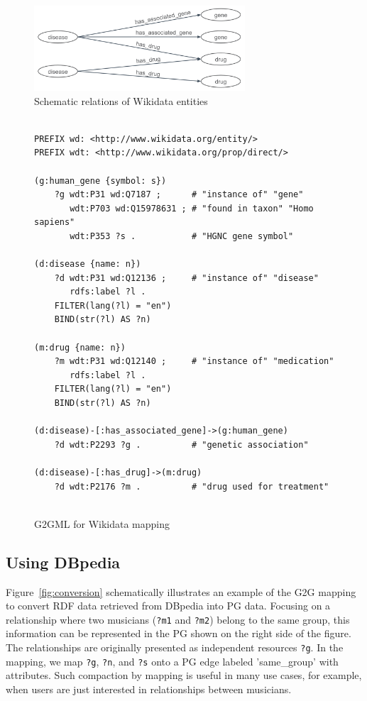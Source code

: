 \documentclass[runningheads]{llncs}
\begin{document}
\begin{figure}
\center
\includegraphics[width=0.7\textwidth]{wikidata_schema.png}
\caption{Schematic relations of Wikidata entities}
\label{fig:wikidata_schema.png}
\end{figure}
 
\begin{figure}[!t]
\vspace{2mm}
\begin{scriptsize}
\begin{verbatim}
 
PREFIX wd: <http://www.wikidata.org/entity/>
PREFIX wdt: <http://www.wikidata.org/prop/direct/>
 
(g:human_gene {symbol: s})
    ?g wdt:P31 wd:Q7187 ;      # "instance of" "gene"
       wdt:P703 wd:Q15978631 ; # "found in taxon" "Homo sapiens"
       wdt:P353 ?s .           # "HGNC gene symbol"
 
(d:disease {name: n})
    ?d wdt:P31 wd:Q12136 ;     # "instance of" "disease"
       rdfs:label ?l .
    FILTER(lang(?l) = "en")
    BIND(str(?l) AS ?n)
 
(m:drug {name: n})
    ?m wdt:P31 wd:Q12140 ;     # "instance of" "medication"
       rdfs:label ?l .
    FILTER(lang(?l) = "en")
    BIND(str(?l) AS ?n)
 
(d:disease)-[:has_associated_gene]->(g:human_gene)
    ?d wdt:P2293 ?g .          # "genetic association"
 
(d:disease)-[:has_drug]->(m:drug)
    ?d wdt:P2176 ?m .          # "drug used for treatment"
 
\end{verbatim}
\end{scriptsize}
\caption{G2GML for Wikidata mapping}
\label{fig:g2gml_wikidata}
\end{figure}
 
\subsection{Using DBpedia}
 
Figure~\ref{fig:conversion} schematically illustrates an example of the G2G mapping to convert RDF data retrieved from DBpedia into PG data. 
Focusing on a relationship where two musicians (\texttt{?m1} and \texttt{?m2}) belong to the same group, this information can be represented in the PG shown on the right side of the figure. The relationships are originally presented as independent resources \texttt{?g}. In the mapping, we map \texttt{?g}, \texttt{?n}, and \texttt{?s} onto a PG edge labeled 'same_group' with attributes. Such compaction by mapping is useful in many use cases, for example, when users are just interested in relationships between musicians.
 
\end{document}
